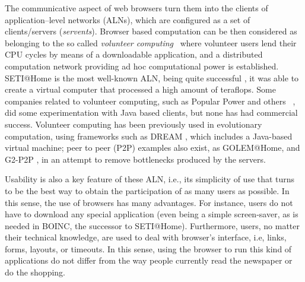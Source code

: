 \documentclass[runningheads,a4paper]{llncs}
\begin{document}
The communicative aspect of web browsers turn them into the clients of application--level networks (ALNs), which are configured as a set of
clients/servers ({\em servents}). Browser based computation can be then considered as belonging to the so called  {\em volunteer computing}~\cite{sarmenta-bayanihan,hpvc} where volunteer users lend their CPU cycles by means of a downloadable application, and a distributed computation network providing ad hoc computational power is established. SETI@Home is the most well-known ALN, being quite successful \cite{david-seti:home}, it was able to	
create a virtual computer that processed a high amount of
teraflops.  Some companies related to volunteer computing, such as Popular Power and
others ~\cite{Cappello}, did some experimentation with Java based
clients, but none has had commercial success. Volunteer computing has
been previously used in evolutionary computation, using
frameworks such as DREAM \cite{LNCS2439:ID197:pp665}, which includes a
Java-based virtual machine; peer to peer (P2P) examples also exist, as  GOLEM@Home, and G2-P2P \cite{G2-P2P}, in an attempt to remove bottlenecks produced by the servers.


Usability is also a key feature of these ALN, i.e., its simplicity
of use that turns to be the best way to obtain the participation of as
many users as possible. In this sense, the use of browsers has many advantages. For instance, users do not have to download any special application (even being a simple screen-saver, as is needed in BOINC, the successor to SETI@Home). Furthermore, users, no matter their technical knowledge, are used to deal with browser's interface, i.e, links, forms, layouts, or timeouts. In this sense, using the browser to run this kind of applications do not differ from the way people currently read the newspaper or do the shopping.
\end{document}
